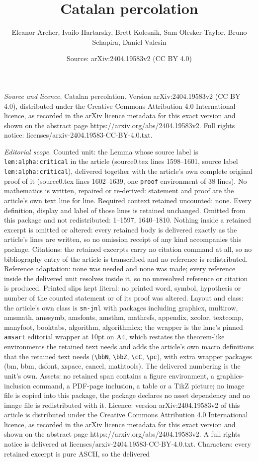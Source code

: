 \documentclass[10pt,a4paper]{amsart}
\title[Catalan percolation]{Catalan percolation}
\author{Eleanor Archer, Ivailo Hartarsky, Brett Kolesnik, Sam Olesker-Taylor, Bruno Schapira, Daniel Valesin}
\date{Source: arXiv:2404.19583v2 (CC BY 4.0)}
\begin{document}
\maketitle

\noindent\emph{Source and licence.} Catalan percolation. Version arXiv:2404.19583v2 (CC BY 4.0), distributed under the Creative Commons Attribution 4.0 International licence, as recorded in the arXiv licence metadata for this exact version and shown on the abstract page https://arxiv.org/abs/2404.19583v2. Full rights notice: licenses/arxiv-2404.19583-CC-BY-4.0.txt.\par\smallskip

\noindent\textit{Editorial scope.} Counted unit: the Lemma whose source label is \texttt{lem:alpha:critical} in the article (source0.tex lines 1598--1601, source label \texttt{lem:alpha:critical}), delivered together with the article's own complete original proof of it (source0.tex lines 1602--1639, one \texttt{proof} environment of 38 lines). No mathematics is written, repaired or re-derived: statement and proof are the article's own text line for line. Required context retained uncounted: none. Every definition, display and label of those lines is retained unchanged. Omitted from this package and not redistributed: 1--1597, 1640--1810. Nothing inside a retained excerpt is omitted or altered: every retained body is delivered exactly as the article's lines are written, so no omission receipt of any kind accompanies this package. Citations: the retained excerpts carry no citation command at all, so no bibliography entry of the article is transcribed and no reference is redistributed. Reference adaptation: none was needed and none was made; every reference inside the delivered unit resolves inside it, so no unresolved reference or citation is produced. Printed slips kept literal: no printed word, symbol, hypothesis or number of the counted statement or of its proof was altered. Layout and class: the article's own class is \texttt{sn-jnl} with packages including graphicx, multirow, amsmath, amssymb, amsfonts, amsthm, mathrsfs, appendix, xcolor, textcomp, manyfoot, booktabs, algorithm, algorithmicx; the wrapper is the lane's pinned \texttt{amsart} editorial wrapper at 10pt on A4, which restates the theorem-like environments the retained text needs and adds the article's own macro definitions that the retained text needs (\texttt{\textbackslash bbN}, \texttt{\textbackslash bbZ}, \texttt{\textbackslash cC}, \texttt{\textbackslash pc}), with extra wrapper packages (bm, bbm, dsfont, xspace, cancel, mathtools). The delivered numbering is the unit's own. Assets: no retained span contains a figure environment, a graphics-inclusion command, a PDF-page inclusion, a table or a TikZ picture; no image file is copied into this package, the package declares no asset dependency and no image file is redistributed with it. Licence: version arXiv:2404.19583v2 of this article is distributed under the Creative Commons Attribution 4.0 International licence, as recorded in the arXiv licence metadata for this exact version and shown on the abstract page https://arxiv.org/abs/2404.19583v2. A full rights notice is delivered at licenses/arxiv-2404.19583-CC-BY-4.0.txt. Characters: every retained excerpt is pure ASCII, so the delivered 
\end{document}
